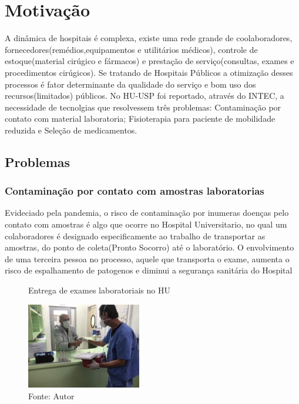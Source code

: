 \documentclass[../poliXuniversity_hospital_(USP)_report.tex]{subfiles}
\begin{document}
\chapter{Motivação}

A dinâmica de hospitais é complexa, existe uma rede grande de coolaboradores, fornecedores(remédios,equipamentos e utilitários médicos), controle de estoque(material cirúgico e fármacos) e prestação de serviço(consultas, exames e procedimentos cirúgicos). Se tratando de Hospitais Públicos a otimização desses processos é fator determinante da qualidade do serviço e bom uso dos recursos(limitados) públicos. No HU-USP foi reportado, através do INTEC, a necessidade de tecnolgias que resolvessem três problemas: Contaminação por contato com material laboratoria; Fisioterapia para paciente de mobilidade reduzida e Seleção de medicamentos.

\section{Problemas}



\subsection{Contaminação por contato com amostras laboratorias}



Evideciado pela pandemia, o risco de contaminação por inumeras doenças pelo contato com amostras é algo que ocorre no Hospital Universitario, no qual um colaboradores é designado especificamente ao trabalho de transportar as amostras, do ponto de coleta(Pronto Socorro) até o laboratório. O envolvimento de uma terceira pessoa no processo, aquele que transporta o exame, aumenta o risco de espalhamento de patogenos e diminui a segurança sanitária do Hospital

\begin{figure}[ht]
\centering
    \caption{Entrega de exames laboratoriais no HU}
    \centering %
    \includegraphics[width=5cm]{images/entrega_exames.jpeg}
    \caption*{Fonte: Autor}
    \label{figura: Entrega de exames laboratoriais}
\end{figure}
\end{document}
